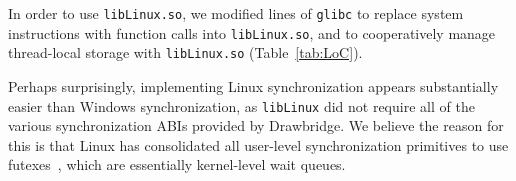 \begin{comment}
Most {\tt libLinux.so} code reimplements
Linux kernel functionality.  We found it expedient to 
read the Linux source in order to understand its behavior and then reimplement 
that behavior on the PAL ABI in most cases.
In some cases, such as the file caching code,
we refactored code directly from the Linux kernel.
\end{comment}

In order to use {\tt libLinux.so}, we modified \libclines{} lines of {\tt glibc} to replace 
system instructions with function calls into {\tt lib\-Linux.so},
and to cooperatively manage thread-local storage with {\tt libLinux.so} (Table~\ref{tab:LoC}).




\begin{comment}
\vspace{5pt}
\noindent{\bf ABI Extensions.~}
Graphene extends the Drawbridge ABI with 9 additional PAL calls.
As discussed above, one creates a new sandbox, and 
5 additional calls were added for IPC.
We also add 3 calls to manage x86 segmentation registers
and exceptions (Bascule~\cite{baumann13bascule} adds
similar extensions).
\end{comment}

\vspace{5pt}
 Perhaps surprisingly, implementing Linux
synchronization appears substantially easier than Windows synchronization, 
as {\tt libLinux} did not require all of the various
synchronization ABIs provided by Drawbridge.
We believe the reason for this is that Linux has consolidated 
all user-level synchronization primitives to use futexes~\cite{franke02futex},
which are essentially kernel-level wait queues.

%


